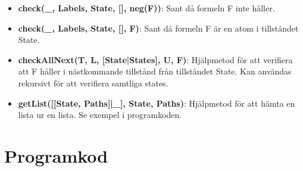 \documentclass{article}
\begin{document}
\begin{itemize}
    \item \textbf{check(\_, Labels, State, [], neg(F))}: Sant då formeln F inte
      håller.

    \item \textbf{check(\_, Labels, State, [], F)}: Sant då formeln F är en atom
      i tillståndet State.

    \item \textbf{checkAllNext(T, L, [State|States], U, F)}: Hjälpmetod för att
      verifiera att F håller i nästkommande tillstånd från tillståndet State.
      Kan användas rekursivt för att verifiera samtliga states.

    \item \textbf{getList([[State, Paths]|\_], State, Paths)}: Hjälpmetod för
      att hämta en lista ur en lista. Se exempel i programkoden.
  \end{itemize}

  \section{Programkod}
  
\end{document}
